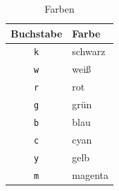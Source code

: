 \begin{table}[H]
  \centering{}
  \caption{Farben}
  \label{tab:plt_colors}
  \begin{tabular}{c l}
    \toprule
      Buchstabe & Farbe \\
    \midrule
      \texttt{k} & schwarz \\
      \texttt{w} & weiß \\
      \texttt{r} & rot \\
      \texttt{g} & grün \\
      \texttt{b} & blau \\
      \texttt{c} & cyan \\
      \texttt{y} & gelb \\
      \texttt{m} & magenta \\
    \bottomrule
  \end{tabular}
\end{table}

